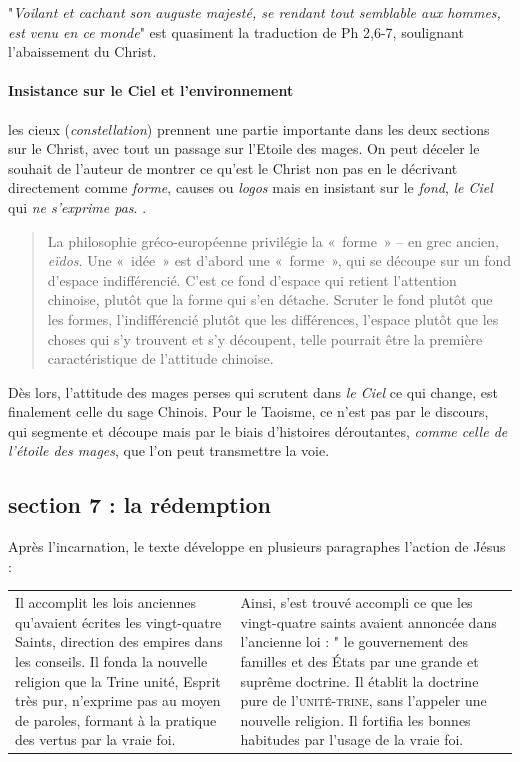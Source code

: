  "\textit{Voilant et cachant son auguste majesté, se rendant tout semblable aux hommes, est venu en ce monde}" est quasiment la traduction de Ph 2,6-7, soulignant l'abaissement du Christ.
 

\paragraph{Insistance sur le Ciel et l'environnement}  les cieux (\textit{constellation}) prennent une partie importante dans les deux sections sur le Christ, avec tout un passage sur l'Etoile des mages. On peut  déceler le souhait de l'auteur de montrer ce qu'est le Christ non pas en le décrivant directement comme \textit{forme},  causes ou \textit{logos} mais en insistant sur le \textit{fond},  \textit{le Ciel} qui \textit{ne s'exprime pas}. \cite[p. 109]{PolDroit:voyage} . 
\begin{quote}
    La philosophie gréco-européenne privilégie la « forme » – en grec ancien, \textit{eïdos}. Une « idée » est d’abord une « forme », qui se découpe sur un fond d’espace indifférencié. C’est ce fond d’espace qui retient l’attention chinoise, plutôt que la forme qui s’en détache. Scruter le fond plutôt que les formes, l’indifférencié plutôt que les différences, l’espace plutôt que les choses qui s’y trouvent et s’y découpent, telle pourrait être la première caractéristique de l’attitude chinoise.\cite[pp. 110-111]{PolDroit:voyage}  
\end{quote}
Dès lors, l'attitude des mages perses qui scrutent dans \textit{le Ciel} ce qui change, est finalement celle du sage Chinois. Pour le Taoisme, ce n'est pas par le discours, qui segmente et découpe mais par le biais d'histoires déroutantes, \textit{comme celle de l'étoile des mages}, que l'on peut transmettre la voie. \cite[p. 130-141 ]{PolDroit:voyage} 
 




\subsection{section 7 : la rédemption } 


Après l'incarnation, le texte développe en plusieurs paragraphes l'action de Jésus : 


\begin{tabular}{p{5.5cm}p{5.5cm}}
\\
Il accomplit les lois anciennes qu'avaient écrites les vingt-quatre Saints, direction des empires dans les conseils. Il fonda la nouvelle religion que la Trine unité, Esprit très pur, n'exprime pas au moyen de paroles, formant à la pratique des vertus par la vraie foi.  & Ainsi, s'est trouvé accompli ce que les vingt-quatre saints avaient annoncée dans l'ancienne loi : " le gouvernement des familles et des États par une grande et suprême doctrine. Il établit la doctrine pure de l'\textsc{unité-trine}, sans l'appeler une nouvelle religion. Il fortifia les bonnes habitudes par l'usage de la vraie foi. \\
\end{tabular}

